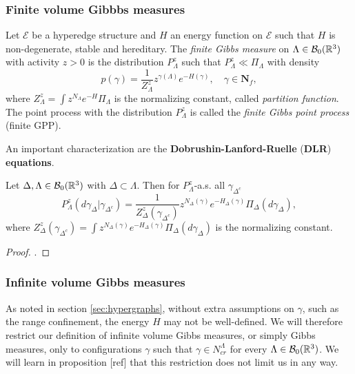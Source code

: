 \subsubsection{Finite volume Gibbbs measures}


\begin{definition}\label{def:fGPP}
	Let $\mathcal E$ be a hyperedge structure and $H$ an energy function on $\mathcal E$ such that $H$ is non-degenerate, stable and hereditary. The \textit{finite Gibbs measure} on $\Lambda\in \mathcal B_0({\mathbb R^3})$ with activity $z>0$ is the distribution $P^z_\Lambda$ such that $P^z_\Lambda \ll \Pi_\Lambda$ with density
	$$p(\gamma) = \frac 1{Z^{z}_\Lambda} z^{\gamma(\Lambda)} e^{-H(\gamma)},\quad \gamma \in \mathbf N_f,$$
where  $Z^z_\Lambda = \int z^{N_\Lambda} e^{-H} \Pi_\Lambda$ is the normalizing constant, called \textit{partition function}. \newline
The point process with the distribution $P^z_{\Lambda}$ is called the \textit{finite Gibbs point process} (finite GPP). 
\end{definition}

An important characterization are the \textbf{Dobrushin-Lanford-Ruelle} (\textbf{DLR}) \textbf{equations}.

\begin{proposition}
	Let $\Delta,\Lambda\in \mathcal B_0({\mathbb R^3})$ with $\Delta \subset \Lambda$. Then for $P^z_{\Lambda}$-a.s. all $\gamma_{\Delta^c}$
	$$P^z_{\Lambda}(d\gamma_\Delta|\gamma_{\Delta^c}) = \frac 1{Z^z_\Delta(\gamma_{\Delta^c})} z^{N_\Delta(\gamma)} e^{-H_\Delta(\gamma)} \Pi_\Delta (d\gamma_\Delta),$$
		where $Z^z_{\Delta}(\gamma_{\Delta^c}) = \int z^{N_\Delta(\gamma)} e^{-H_\Delta(\gamma)} \Pi_\Delta(d\gamma_\Delta)$ is the normalizing constant. 
\end{proposition}
\begin{proof}.
\end{proof}



\subsubsection{Infinite volume Gibbs measures}
As noted in section \ref{sec:hypergraphs}, without extra assumptions on $\gamma$, such as the range confinement, the energy $H$ may not be well-defined. We will therefore restrict our definition of infinite volume Gibbs measures, or simply Gibbs measures, only to configurations $\gamma$ such that $\gamma \in N^\Lambda_{cr}$ for every $\Lambda \in \mathcal B_0({\mathbb R^3})$. We will learn in proposition [ref] that this restriction does not limit us in any way.

